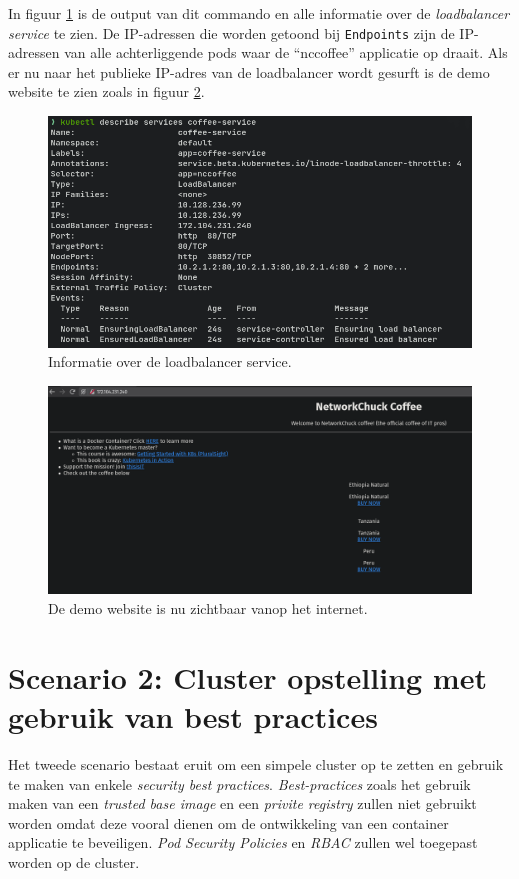In figuur \ref{fig:kubectlDescriveService1} is de output van dit commando en alle informatie over de \textit{loadbalancer service} te zien. De IP-adressen die worden getoond bij \verb|Endpoints| zijn de IP-adressen van alle achterliggende pods waar de ``nccoffee'' applicatie op draait. Als er nu naar het publieke IP-adres van de loadbalancer wordt gesurft is de demo website te zien zoals in figuur \ref{fig:demoSite1}.

\begin{figure}[h]
	\centering
	\includegraphics[width=\linewidth]{img/kubectlDescriveService1.png}
	\caption{Informatie over de loadbalancer service.}
	\label{fig:kubectlDescriveService1}
\end{figure}

\begin{figure}[h]
	\centering
	\includegraphics[width=\linewidth]{img/demoSite1.png}
	\caption{De demo website is nu zichtbaar vanop het internet.}
	\label{fig:demoSite1}
\end{figure}

\clearpage
\section{Scenario 2: Cluster opstelling met gebruik van best practices}
Het tweede scenario bestaat eruit om een simpele cluster op te zetten en gebruik te maken van enkele \textit{security best practices}. \textit{Best-practices} zoals het gebruik maken van een \textit{trusted base image} en een \textit{privite registry} zullen niet gebruikt worden omdat deze vooral dienen om de ontwikkeling van een container applicatie te beveiligen. \textit{Pod Security Policies} en \textit{RBAC} zullen wel toegepast worden op de cluster. 

